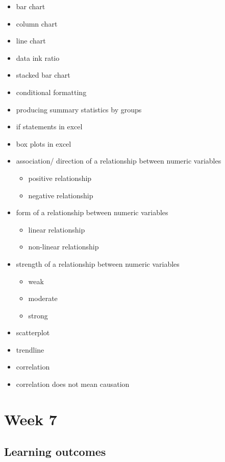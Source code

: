 \documentclass[]{book}
\providecommand{\tightlist}{%
  \setlength{\itemsep}{0pt}\setlength{\parskip}{0pt}}
\theoremstyle{definition}
\theoremstyle{definition}
\theoremstyle{definition}
\theoremstyle{remark}
\begin{document}
\begin{itemize}
\tightlist
\item
  bar chart
\item
  column chart
\item
  line chart
\item
  data ink ratio
\item
  stacked bar chart
\item
  conditional formatting
\item
  producing summary statistics by groups
\item
  if statements in excel
\item
  box plots in excel
\item
  association/ direction of a relationship between numeric variables

  \begin{itemize}
  \tightlist
  \item
    positive relationship
  \item
    negative relationship
  \end{itemize}
\item
  form of a relationship between numeric variables

  \begin{itemize}
  \tightlist
  \item
    linear relationship
  \item
    non-linear relationship
  \end{itemize}
\item
  strength of a relationship between numeric variables

  \begin{itemize}
  \tightlist
  \item
    weak
  \item
    moderate
  \item
    strong
  \end{itemize}
\item
  scatterplot
\item
  trendline
\item
  correlation
\item
  correlation does not mean causation
\end{itemize}

\hypertarget{week7}{%
\chapter{Week 7}\label{week7}}

\hypertarget{learning-outcomes-6}{%
\section{Learning outcomes}\label{learning-outcomes-6}}
\end{document}
